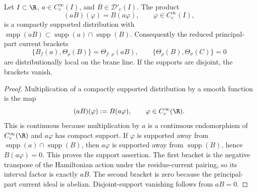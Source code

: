 \begin{lem}
\label{lem:app-distributional-locality-principal-parts}
  Let \(I\subset\R\), \(a\in C^\infty_c(I)\), and
  \(B\in\mathcal D'_c(I)\).  The product
  \[
    (aB)(\varphi)=B(a\varphi),\qquad \varphi\in C^\infty_c(I),
  \]
  is a compactly supported distribution with
  \(\operatorname{supp}(aB)\subset
  \operatorname{supp}(a)\cap\operatorname{supp}(B)\).  Consequently the
  reduced principal-part current brackets
  \[
    \{B_f(a),\Theta_\rho(B)\}
      =\Theta_{f\cdot\rho}(aB),\qquad
    \{\Theta_\rho(B),\Theta_\sigma(C)\}=0
  \]
  are distributionally local on the brane line.  If the supports are
  disjoint, the brackets vanish.
\end{lem}

\begin{proof}
  Multiplication of a compactly supported distribution by a smooth
  function is the map
  \[
    (aB)(\varphi):=B(a\varphi),
    \qquad
    \varphi\in C^\infty_c(\R).
  \]
  This is continuous because multiplication by \(a\) is a continuous
  endomorphism of \(C^\infty_c(\R)\) and
  \(a\varphi\) has compact support.  If
  \(\varphi\) is supported away from
  \(\operatorname{supp}(a)\cap\operatorname{supp}(B)\), then
  \(a\varphi\) is supported away from \(\operatorname{supp}(B)\), hence
  \(B(a\varphi)=0\).  This proves the support assertion.  The first
  bracket is the negative transpose of the Hamiltonian action under the
  residue-current pairing, so its interval factor is exactly \(aB\).
  The second bracket is zero because the principal-part current ideal is
  abelian.  Disjoint-support vanishing follows from \(aB=0\).
\end{proof}

